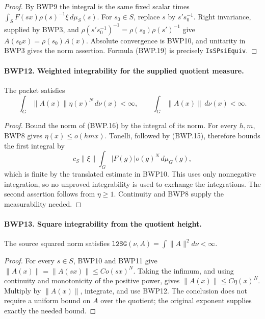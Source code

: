 \begin{proof}
By BWP9 the integral is the same fixed scalar times
\(\int_S F(sx)\rho(s)^{-1}\xi\,d\mu_S(s)\).
For \(s_0\in S\), replace \(s\) by \(s's_0^{-1}\).
Right invariance, supplied by BWP3, and
\(\rho(s's_0^{-1})^{-1}=\rho(s_0)\rho(s')^{-1}\)
give \(A(s_0x)=\rho(s_0)A(x)\).
Absolute convergence is BWP10, and unitarity in BWP3 gives the norm
assertion.  Formula (BWP.19) is precisely \texttt{IsSPsiEquiv}.
\end{proof}

\paragraph{BWP12. Weighted integrability for the supplied quotient measure.}
\label{claim:BWP12}
The packet satisfies
\[
 \int_G\|A(x)\|\eta(x)^N\,d\nu(x)<\infty,
 \qquad \int_G\|A(x)\|\,d\nu(x)<\infty.
 \tag{BWP.20}
\]

\begin{proof}
Bound the norm of (BWP.16) by the integral of its norm.  For every
\(h,m\), BWP8 gives \(\eta(x)\le o(hmx)\).
Tonelli, followed by (BWP.15), therefore bounds the first integral by
\[
 c_S\|\xi\|\int_G |F(g)|o(g)^N\,d\mu_G(g),
\]
which is finite by the translated estimate in BWP10.  This uses only
nonnegative integration, so no unproved integrability is used to
exchange the integrations.  The second assertion follows from
\(\eta\ge1\).  Continuity and BWP8 supply the measurability needed.
\end{proof}

\paragraph{BWP13. Square integrability from the quotient height.}
\label{claim:BWP13}
The source squared norm satisfies
\(\texttt{l2SG}(\nu,A)=\int\|A\|^2d\nu<\infty\).

\begin{proof}
For every \(s\in S\), BWP10 and BWP11 give
\(\|A(x)\|=\|A(sx)\|\le C o(sx)^N\).
Taking the infimum, and using continuity and monotonicity of the
positive power, gives \(\|A(x)\|\le C\eta(x)^N\).
Multiply by \(\|A(x)\|\), integrate, and use BWP12.
The conclusion does not require a uniform bound on \(A\) over
the quotient; the original exponent supplies exactly the needed bound.
\end{proof}

